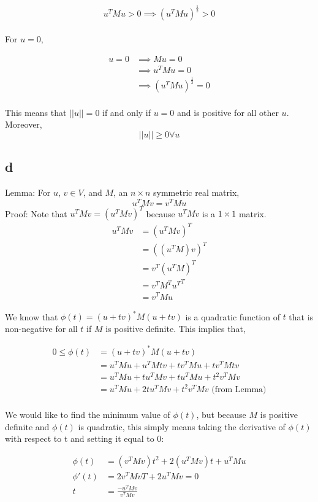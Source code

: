 \documentclass[11pt]{amsart}
\begin{document}
\[u^TMu > 0 \implies (u^TMu)^\frac{1}{2} > 0\]
\\For $u = 0, $

\begin{align*}u = 0 &\implies Mu = 0\\ &\implies u^TMu = 0\\ &\implies (u^TMu)^\frac{1}{2} = 0\end{align*}
\\This means that $||u|| = 0$ if and only if $u = 0$ and is positive for all other $u$. Moreover, 
\[
||u|| \ge 0 \forall u
\]

\subsection*{d}
Lemma: For $u$, $v \in V$, and $M$, an $n \times n$ symmetric real matrix,
\[
u^TMv = v^TMu
\]
Proof: Note that $u^TMv = (u^TMv)^T$ because $u^TMv$ is a $1\times1$ matrix.
\begin{align*}
u^TMv &= (u^TMv)^T\\
&= ((u^TM)v)^T\\
&= v^T(u^TM)^T\\
&= v^TM^T{u^T}^T\\
&= v^TMu
\end{align*}

We know that $\phi (t) = (u+tv)^*M(u+tv) $ is a quadratic function of $t$ that is non-negative for all $t$ if $M$ is positive definite. This implies that,

\begin{align*}
0 \le \phi (t) &= (u+tv)^*M(u+tv)\\
&= u^TMu + u^TMtv + tv^TMu + tv^TMtv\\ 
&= u^TMu + tu^TMv + tu^TMu + t^2v^TMv\\
&= u^TMu + 2tu^TMv + t^2v^TMv \text{ (from Lemma)}\\
\end{align*}

We would like to find the minimum value of $\phi (t)$, but because $M$ is positive definite and $\phi (t)$ is quadratic, this simply means taking the derivative of $\phi (t)$ with respect to t and setting it equal to 0:

\begin{align*}
\phi (t) &= (v^TMv)t^2 + 2(u^TMv)t + u^TMu\\
\phi '(t) &= 2v^TMvT + 2u^TMv = 0\\
t &= \frac{-u^TMv}{v^TMv}
\end{align*}
\end{document}

